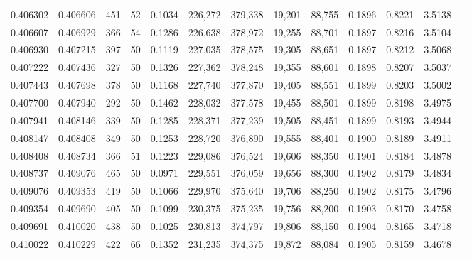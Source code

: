 \begin{tabular}{rrrrrrrrrrrrr}
0.406302 & 0.406606 &   451 &  52 &                                     0.1034 & 226,272 & 379,338 &  19,201 &  88,755 & 0.1896 & 0.8221 & 3.5138 \\
0.406607 & 0.406929 &   366 &  54 &                                     0.1286 & 226,638 & 378,972 &  19,255 &  88,701 & 0.1897 & 0.8216 & 3.5104 \\
0.406930 & 0.407215 &   397 &  50 &                                     0.1119 & 227,035 & 378,575 &  19,305 &  88,651 & 0.1897 & 0.8212 & 3.5068 \\
0.407222 & 0.407436 &   327 &  50 &                                     0.1326 & 227,362 & 378,248 &  19,355 &  88,601 & 0.1898 & 0.8207 & 3.5037 \\
0.407443 & 0.407698 &   378 &  50 &                                     0.1168 & 227,740 & 377,870 &  19,405 &  88,551 & 0.1899 & 0.8203 & 3.5002 \\
0.407700 & 0.407940 &   292 &  50 &                                     0.1462 & 228,032 & 377,578 &  19,455 &  88,501 & 0.1899 & 0.8198 & 3.4975 \\
0.407941 & 0.408146 &   339 &  50 &                                     0.1285 & 228,371 & 377,239 &  19,505 &  88,451 & 0.1899 & 0.8193 & 3.4944 \\
0.408147 & 0.408408 &   349 &  50 &                                     0.1253 & 228,720 & 376,890 &  19,555 &  88,401 & 0.1900 & 0.8189 & 3.4911 \\
0.408408 & 0.408734 &   366 &  51 &                                     0.1223 & 229,086 & 376,524 &  19,606 &  88,350 & 0.1901 & 0.8184 & 3.4878 \\
0.408737 & 0.409076 &   465 &  50 &                                     0.0971 & 229,551 & 376,059 &  19,656 &  88,300 & 0.1902 & 0.8179 & 3.4834 \\
0.409076 & 0.409353 &   419 &  50 &                                     0.1066 & 229,970 & 375,640 &  19,706 &  88,250 & 0.1902 & 0.8175 & 3.4796 \\
0.409354 & 0.409690 &   405 &  50 &                                     0.1099 & 230,375 & 375,235 &  19,756 &  88,200 & 0.1903 & 0.8170 & 3.4758 \\
0.409691 & 0.410020 &   438 &  50 &                                     0.1025 & 230,813 & 374,797 &  19,806 &  88,150 & 0.1904 & 0.8165 & 3.4718 \\
0.410022 & 0.410229 &   422 &  66 &                                     0.1352 & 231,235 & 374,375 &  19,872 &  88,084 & 0.1905 & 0.8159 & 3.4678 \\

\end{tabular}
